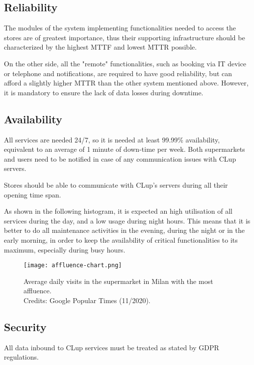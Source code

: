 \documentclass[../../main.tex]{subfiles}
\begin{document}
	\subsection{Reliability}

	The modules of the system implementing functionalities needed to access the stores are of greatest importance, thus their supporting 
	infrastructure should be characterized by the highest MTTF and lowest MTTR possible.

	On the other side, all the "remote" functionalities, such as booking via IT device or telephone and notifications, 
	are required to have good reliability, but can afford a slightly higher MTTR than the other system mentioned above. 
	However, it is mandatory to ensure the lack of data losses during downtime.

	\subsection{Availability}

	All services are needed 24/7, so it is needed at least 99.99\% availability, equivalent to an average of 1 minute of down-time per week. 
	Both supermarkets and users need to be notified in case of any communication issues with CLup servers.

	Stores should be able to communicate with CLup's servers during all their opening time span.

	As shown in the following histogram, it is expected an high utilisation of all services during the day, 
	and a low usage during night hours. This means that it is better to do all maintenance activities in the evening, 
	during the night or in the early morning, in order to keep the availability of critical functionalities to its maximum, 
	especially during busy hours.

	\begin{figure}[H]
	    \centering
	    \texttt{[image: affluence-chart.png]}
	    \caption{Average daily visits in the supermarket in Milan with the most affluence. \\Credits: Google Popular Times (11/2020).}
  	\end{figure}

	\subsection{Security}

	All data inbound to CLup services must be treated as stated by GDPR regulations. 
\end{document}
